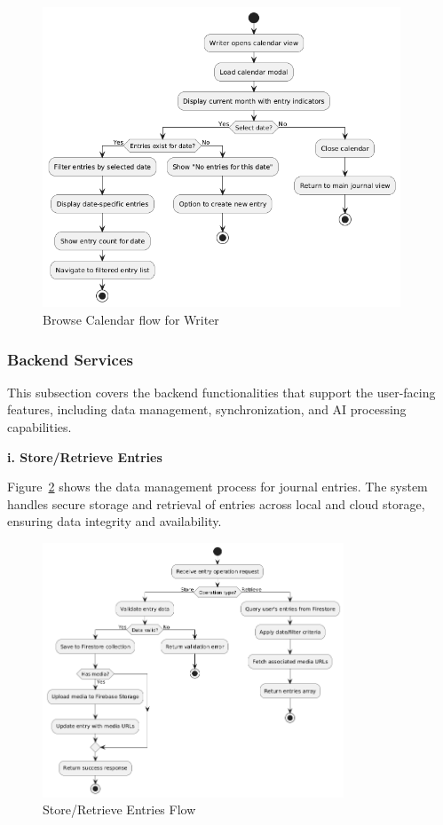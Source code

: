 \begin{figure}[H]
\centering
\includegraphics[width=0.95\textwidth,height=0.7\textheight,keepaspectratio]{files/imgs/browse_calendar_flow.png}
\caption{Browse Calendar flow for Writer}
\label{fig:browse-calendar-flow}
\end{figure}
\clearpage

\subsubsection{Backend Services}\label{subsubsec:backendServices}

This subsection covers the backend functionalities that support the user-facing features, including data management, synchronization, and AI processing capabilities.

\textbf{i. Store/Retrieve Entries}

Figure~\ref{fig:store-retrieve-entries-flow} shows the data management process for journal entries. The system handles secure storage and retrieval of entries across local and cloud storage, ensuring data integrity and availability.

\begin{figure}[H]
\centering
\includegraphics[width=0.8\textwidth]{files/imgs/store_retrieve_entries_flow.png}
\caption{Store/Retrieve Entries Flow}
\label{fig:store-retrieve-entries-flow}
\end{figure}
\clearpage

